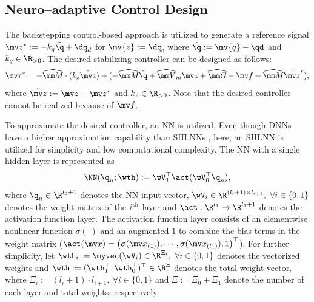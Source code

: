 \documentclass[letterpaper, 10 pt, conference]{ieeeconf}  %
\begin{document}
\subsection{Neuro–adaptive Control Design} \label{sec:ctrl dev}

The backstepping control-based approach is utilized to generate a reference signal $\mv z^*:= -{k_q}\tilde {\q}+\dq_d$ for $\mv {z}:= \dq$, where $\tilde {\q}:= \mv {q} - \qd$ and $k_q\in\R_{>0}$.
The desired stabilizing controller can be designed as follows:
\begin{equation}
    \mv \tau^* = 
    -\widehat{\mm M}\cdot ({k_z}\tilde {\mv z})
    + 
    ( 
        -\widehat{\mm M}\tilde {\q}
        +
        \widehat{\mm V}_m{\mv z}
        +
        \widehat{\mm G}
        -
        \mv f
        +
        \widehat{\mm M} \dot {\mv z}^*
    ) 
    ,
    \label{eq. desired control}
\end{equation}
where $\tilde {\mv z}:= \mv z-\mv z^*$ and $k_z\in\R_{>0}$.
Note that the desired controller cannot be realized because of $\mv f$.

To approximate the desired controller, an NN is utilized.
Even though DNNs have a higher approximation capability than SHLNNs \cite{Rolnick:2018aa}, here, an SHLNN is utilized for simplicity and low computational complexity.
The NN with a single hidden layer is represented as 
\begin{equation}
    \NN({\q_{n}};\wth):= \wV_1^\top \act(\wV_0^\top {\q_{n}})
    ,
\end{equation}
where ${\q_{n}}\in\R^{l_0+1}$ denotes the NN input vector, $\wV_i\in\R^{(l_i+1)\times l_{i+1}},\ \forall i\in\{0,1\}$ denotes the weight matrix of the $i\textsuperscript{th}$ layer and $\act:\R^{l_1}\to\R^{l_1+1}$ denotes the activation function layer.
The activation function layer consists of an elementwise nonlinear function $\sigma(\cdot)$ and an augmented $1$ to combine the bias terms in the weight matrix (\ie $\act(\mv x) = \left(\sigma(\mv x_{(1)}),\cdots, \sigma(\mv x_{(l_1)}), 1\right)^\top $).
For further simplicity, let $\wth_i:= \myvec(\wV_i)\in\R^{\Xi_i},\ \forall i\in\{0,1\}$ denotes the vectorized weights and $\wth:=(\wth_1^\top ,\wth_0^\top )^\top \in\R^{\Xi}$ denotes the total weight vector, where $\Xi_i:=(l_i+1)\cdot l_{i+1},\ \forall i\in\{0,1\}$ and $\Xi:=\Xi_0+\Xi_1$ denote the number of each layer and total weights, respectively.
\end{document}
